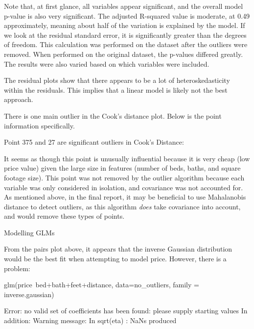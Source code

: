 \documentclass[11pt, a4paper]{article}
\begin{document}
Note that, at first glance, all variables appear significant, and the overall model p-value is also very significant. The adjusted R-squared value is moderate, at 0.49 approximately, meaning about half of the variation is explained by the model. If we look at the residual standard error, it is significantly greater than the degrees of freedom. This calculation was performed on the dataset after the outliers were removed. When performed on the original dataset, the p-values differed greatly. The results were also varied based on which variables were included.
\par
The residual plots show that there appears to be a lot of heteroskedasticity within the residuals. This implies that a linear model is likely not the best approach.
\par
There is one main outlier in the Cook's distance plot. Below is the point information specifically.

\begin{Schunk}
\begin{Soutput}
Point 375 and 27 are significant outliers in Cook's Distance:
\end{Soutput}
\end{Schunk}

It seems as though this point is unusually influential because it is very cheap (low price value) given the large size in features (number of beds, baths, and square footage size). This point was not removed by the outlier algorithm because each variable was only considered in isolation, and covariance was not accounted for. As mentioned above, in the final report, it may be beneficial to use Mahalanobis distance to detect outliers, as this algorithm \textit{does} take covariance into account, and would remove these types of points. 


\pagebreak
Modelling GLMs


\par
From the pairs plot above, it appears that the inverse Gaussian distribution would be the best fit when attempting to model price. However, there is a problem:

\begin{Schunk}
\begin{Soutput}
glm(price~bed+bath+feet+distance, data=no_outliers, family = inverse.gaussian)
\end{Soutput}
\begin{Soutput}
Error: no valid set of coefficients has been found: please supply starting values
In addition: Warning message:
In sqrt(eta) : NaNs produced
\end{Soutput}
\end{Schunk}
\end{document}
